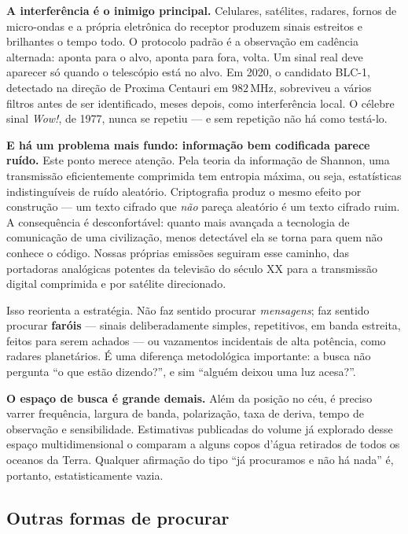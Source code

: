 \documentclass[11pt,a4paper]{article}
\begin{document}
\textbf{A interferência é o inimigo principal.} Celulares, satélites, radares, fornos de micro-ondas e a própria eletrônica do receptor produzem sinais estreitos e brilhantes o tempo todo. O protocolo padrão é a observação em cadência alternada: aponta para o alvo, aponta para fora, volta. Um sinal real deve aparecer só quando o telescópio está no alvo. Em 2020, o candidato BLC-1, detectado na direção de Proxima Centauri em $982\,\mathrm{MHz}$, sobreviveu a vários filtros antes de ser identificado, meses depois, como interferência local. O célebre sinal \textit{Wow!}, de 1977, nunca se repetiu --- e sem repetição não há como testá-lo.

\textbf{E há um problema mais fundo: informação bem codificada parece ruído.} Este ponto merece atenção. Pela teoria da informação de Shannon, uma transmissão eficientemente comprimida tem entropia máxima, ou seja, estatísticas indistinguíveis de ruído aleatório. Criptografia produz o mesmo efeito por construção --- um texto cifrado que \emph{não} pareça aleatório é um texto cifrado ruim. A consequência é desconfortável: quanto mais avançada a tecnologia de comunicação de uma civilização, menos detectável ela se torna para quem não conhece o código. Nossas próprias emissões seguiram esse caminho, das portadoras analógicas potentes da televisão do século XX para a transmissão digital comprimida e por satélite direcionado.

Isso reorienta a estratégia. Não faz sentido procurar \emph{mensagens}; faz sentido procurar \textbf{faróis} --- sinais deliberadamente simples, repetitivos, em banda estreita, feitos para serem achados --- ou vazamentos incidentais de alta potência, como radares planetários. É uma diferença metodológica importante: a busca não pergunta ``o que estão dizendo?'', e sim ``alguém deixou uma luz acesa?''.

\textbf{O espaço de busca é grande demais.} Além da posição no céu, é preciso varrer frequência, largura de banda, polarização, taxa de deriva, tempo de observação e sensibilidade. Estimativas publicadas do volume já explorado desse espaço multidimensional o comparam a alguns copos d'água retirados de todos os oceanos da Terra. Qualquer afirmação do tipo ``já procuramos e não há nada'' é, portanto, estatisticamente vazia.

\subsection*{Outras formas de procurar}
\end{document}
